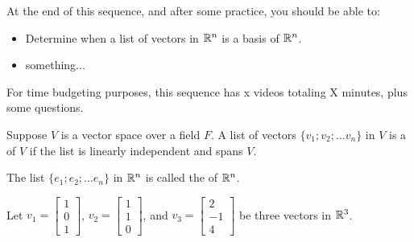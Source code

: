 







At the end of this sequence, and after some practice, you should be able to:

\begin{itemize}
\item Determine when a list of vectors in $\mathbb R^n$ is a basis of $\mathbb R^n$.    
\item something...
\end{itemize}


For time budgeting purposes, this sequence has x videos totaling X minutes, 
plus some questions.  




\endedxtext

\endedxvertical








{}  
Suppose $V$ is a vector space over a field $F$.  A list of vectors $\{v_1; v_2; \ldots v_n\}$ in $V$ is a 
{}  
of $V$ if the list is linearly independent and spans $V$.  

{}  
The list $\{e_1; e_2; \ldots e_n\}$ in $\mathbb R^n$ is called the {} of $\mathbb R^n$.  




\endedxtext

\endedxvertical






Let $v_1 = \left[ \begin{array}{c} 1 \\ 0 \\1 \end{array} \right]$, 
$v_2 = \left[ \begin{array}{c} 1 \\ 1 \\ 0 \end{array} \right]$, and 
$v_3 = \left[ \begin{array}{c} 2 \\ -1 \\ 4 \end{array} \right]$ be three vectors in $\mathbb R^3$.  

